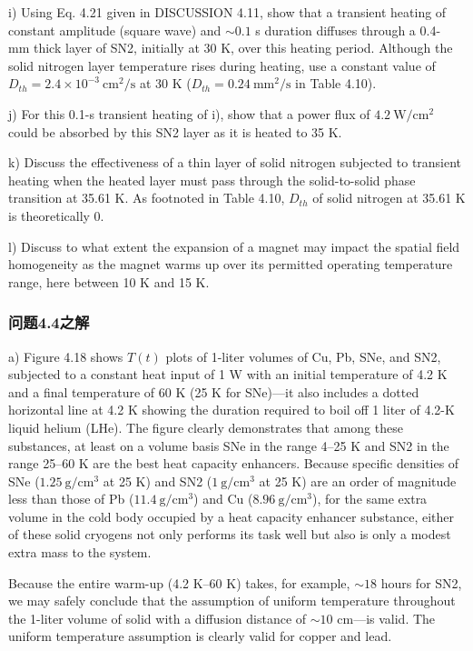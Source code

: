 i) Using Eq. 4.21 given in DISCUSSION 4.11, show that a transient heating of
constant amplitude (square wave) and $\sim 0.1$ s  duration diffuses through a 0.4-
mm thick layer of SN2, initially at 30 K, over this heating period. Although
the solid nitrogen layer temperature rises during heating, use a constant value
of $D_{th}=2.4×10^{−3}\ \mathrm{cm^2/s}$ at 30 K ($D_{th}=0.24\ \mathrm{mm^2/s}$ in Table 4.10).


j) For this 0.1-s transient heating of i), show that a power flux of $4.2\ \mathrm{W/cm^2}$
could be absorbed by this SN2 layer as it is heated to 35 K.


k) Discuss the effectiveness of a thin layer of solid nitrogen subjected to transient
heating when the heated layer must pass through the solid-to-solid phase
transition at 35.61 K. As footnoted in Table 4.10, $D_{th}$ of solid nitrogen at
35.61 K is theoretically 0.


l) Discuss to what extent the expansion of a magnet may impact the spatial
field homogeneity as the magnet warms up over its permitted operating temperature range, here between 10 K and 15 K.

\subsubsection{问题4.4之解}
a) Figure 4.18 shows $T(t)$ plots of 1-liter volumes of Cu, Pb, SNe, and SN2,
subjected to a constant heat input of 1 W with an initial temperature of 4.2 K and
a final temperature of 60 K (25 K for SNe)—it also includes a dotted horizontal
line at 4.2 K showing the duration required to boil off 1 liter of 4.2-K liquid helium
(LHe). The figure clearly demonstrates that among these substances, at least on
a volume basis SNe in the range 4–25 K and SN2 in the range 25–60 K are the
best heat capacity enhancers. Because specific densities of SNe ($1.25\ \mathrm{g/cm^3}$ at
25 K) and SN2 ($1\ \mathrm{g/cm^3}$ at 25 K) are an order of magnitude less than those of Pb
($11.4\ \mathrm{g/cm^3}$) and Cu ($8.96\ \mathrm{g/cm^3}$), for the same extra volume in the cold body
occupied by a heat capacity enhancer substance, either of these solid cryogens not
only performs its task well but also is only a modest extra mass to the system.


Because the entire warm-up (4.2 K–60 K) takes, for example, $\sim 18$ hours for SN2,
we may safely conclude that the assumption of uniform temperature throughout
the 1-liter volume of solid with a diffusion distance of $\sim 10$ cm—is
valid. The uniform temperature assumption is clearly valid for copper and lead.

